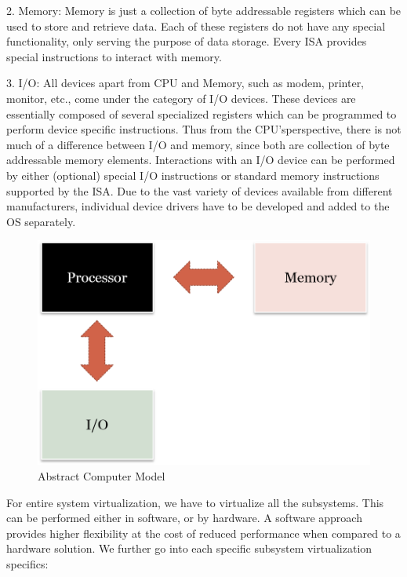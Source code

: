 2. Memory: Memory is just a collection of byte addressable registers which can be used to store and retrieve data. Each of these registers do not have any special functionality, only serving the purpose of data storage. Every ISA provides special instructions to interact with memory. 

3. I/O: All devices apart from CPU and Memory, such as modem, printer, monitor, etc., come under the category of I/O devices. These devices are essentially composed of several specialized registers which can be programmed to perform device specific instructions. Thus from the CPU’sperspective, there is not much of a difference between I/O and memory, since both are collection of byte addressable memory elements. Interactions with an I/O device can be performed by either (optional) special I/O instructions or standard memory instructions supported by the ISA. Due to the vast variety of devices available from different manufacturers, individual device drivers have to be developed and added to the OS separately. 


\setlength{\belowcaptionskip}{-10pt}

\begin{figure}[H]
  \centering
  \includegraphics[scale=0.6]{figures/Mem_IO_CPU.png}
  \caption{Abstract Computer Model}
  \label{fig:mem_io}
\end{figure}

For entire system virtualization, we have to virtualize all the subsystems. This can be performed either in software, or by hardware. A software approach provides higher flexibility at the cost of reduced performance when  compared to a hardware solution. We further go into each specific subsystem virtualization specifics: 


